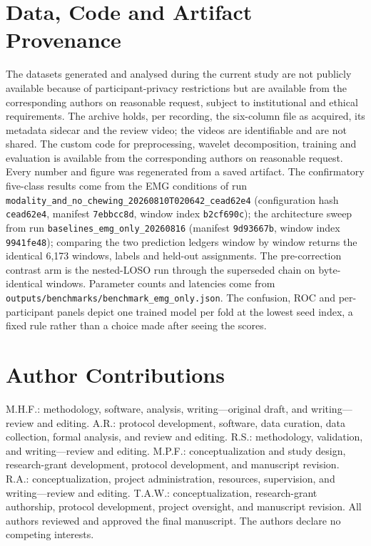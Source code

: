 \documentclass[journal]{IEEEtran}
\begin{document}
\section{Data, Code and Artifact Provenance}
\label{sec:s_provenance}

The datasets generated and analysed during the current study are not publicly available because of participant-privacy restrictions but are available from the corresponding authors on reasonable request, subject to institutional and ethical requirements. The archive holds, per recording, the six-column file as acquired, its metadata sidecar and the review video; the videos are identifiable and are not shared. The custom code for preprocessing, wavelet decomposition, training and evaluation is available from the corresponding authors on reasonable request. Every number and figure was regenerated from a saved artifact. The confirmatory five-class results come from the EMG conditions of run \texttt{modality\_and\_no\_chewing\_}\allowbreak\texttt{20260810T020642\_cead62e4} (configuration hash \texttt{cead62e4}, manifest \texttt{7ebbcc8d}, window index \texttt{b2cf690c}); the architecture sweep from run \texttt{baselines\_emg\_only\_20260816} (manifest \texttt{9d93667b}, window index \texttt{9941fe48}); comparing the two prediction ledgers window by window returns the identical 6,173 windows, labels and held-out assignments. The pre-correction contrast arm is the nested-LOSO run through the superseded chain on byte-identical windows. Parameter counts and latencies come from \texttt{outputs/benchmarks/}\allowbreak\texttt{benchmark\_emg\_only.json}. The confusion, ROC and per-participant panels depict one trained model per fold at the lowest seed index, a fixed rule rather than a choice made after seeing the scores.

\section{Author Contributions}
\label{sec:s_contrib}

M.H.F.: methodology, software, analysis, writing---original draft, and writing---review and editing. A.R.: protocol development, software, data curation, data collection, formal analysis, and review and editing. R.S.: methodology, validation, and writing---review and editing. M.P.F.: conceptualization and study design, research-grant development, protocol development, and manuscript revision. R.A.: conceptualization, project administration, resources, supervision, and writing---review and editing. T.A.W.: conceptualization, research-grant authorship, protocol development, project oversight, and manuscript revision. All authors reviewed and approved the final manuscript. The authors declare no competing interests.



\end{document}
